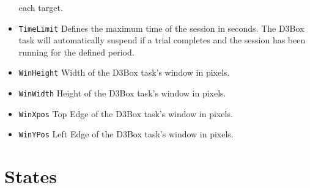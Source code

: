 \documentclass[letterpaper,oneside,12pt]{article}
\begin{document}
\begin{itemize}
        each target.
  \item {\tt TimeLimit} Defines the maximum time of the session in seconds. The D3Box
        task will automatically suspend if a trial completes and the session has been
        running for the defined period.
  \item {\tt WinHeight} Width of the D3Box task's window in pixels.
  \item {\tt WinWidth} Height of the D3Box task's window in pixels. 
  \item {\tt WinXpos} Top Edge of the D3Box task's window in pixels.
  \item {\tt WinYPos} Left Edge of the D3Box task's window in pixels. 
\end{itemize}

\section{States}
\end{document}
